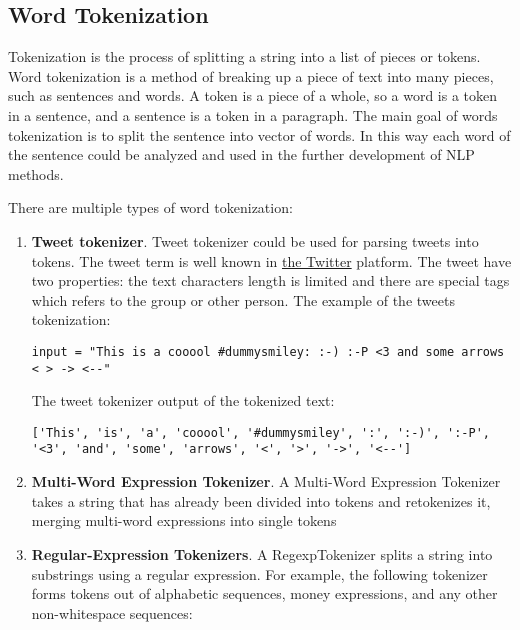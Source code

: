 \subsection{Word Tokenization}

Tokenization \cite[]{BIB1} is the process of splitting a string into a list of pieces or tokens. Word tokenization is a method of breaking up a piece of text into many pieces, such as sentences and words. A token is a piece of a whole, so a word is a token in a sentence, and a sentence is a token in a paragraph. The main goal of words tokenization is to split the sentence into vector of words. In this way each word of the sentence could be analyzed and used in the further development of NLP methods. 


There are multiple types of word tokenization:
\begin{enumerate}
    \item \textbf{Tweet tokenizer}. Tweet tokenizer could be used for parsing tweets into tokens. The tweet term is well known in \href{https://twitter.com/}{the Twitter} platform. The tweet have two properties: the text characters length is limited and there are special tags which refers to the group or other person. The example of the tweets tokenization:
    
    \begin{center}
        \begin{lstlisting}[numbers=none]
        input = "This is a cooool #dummysmiley: :-) :-P <3 and some arrows < > -> <--"
        \end{lstlisting}
        \label{figure: tweetTokenizer_input}
    \end{center}
    
    The tweet tokenizer output of the tokenized text:
    \begin{center}
        \begin{lstlisting}[numbers=none]
        ['This', 'is', 'a', 'cooool', '#dummysmiley', ':', ':-)', ':-P', '<3', 'and', 'some', 'arrows', '<', '>', '->', '<--']
        \end{lstlisting}
        \label{figure: tweetTokenizer_output}
    \end{center}
    
    \item \textbf{Multi-Word Expression Tokenizer}. A Multi-Word Expression Tokenizer takes a string that has already been divided into tokens and retokenizes it, merging multi-word expressions into single tokens
    \item \textbf{Regular-Expression Tokenizers}. A RegexpTokenizer splits a string into substrings using a regular expression. For example, the following tokenizer forms tokens out of alphabetic sequences, money expressions, and any other non-whitespace sequences:
    

\end{enumerate}
